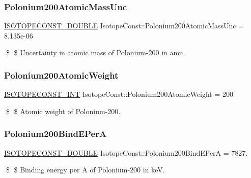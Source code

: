 \subsubsection{\texorpdfstring{Polonium200\+Atomic\+Mass\+Unc}{Polonium200AtomicMassUnc}}
{\footnotesize\ttfamily \mbox{\hyperlink{group___isotope_const-_macros_ga8f45a7272ce02c0b4c65c44636ed719a}{I\+S\+O\+T\+O\+P\+E\+C\+O\+N\+S\+T\+\_\+\+D\+O\+U\+B\+LE}} Isotope\+Const\+::\+Polonium200\+Atomic\+Mass\+Unc = 8.\+135e-\/06}

\$ \$ Uncertainty in atomic mass of Polonium-\/200 in amu. \mbox{\label{group___isotope_const-_polonium-_po200_gaa5de176e4cfec4ef41879cecb3fe0255}} 
\subsubsection{\texorpdfstring{Polonium200\+Atomic\+Weight}{Polonium200AtomicWeight}}
{\footnotesize\ttfamily \mbox{\hyperlink{group___isotope_const-_macros_ga5f18360b3e99483a35c32d789e62621c}{I\+S\+O\+T\+O\+P\+E\+C\+O\+N\+S\+T\+\_\+\+I\+NT}} Isotope\+Const\+::\+Polonium200\+Atomic\+Weight = 200}

\$ \$ Atomic weight of Polonium-\/200. \mbox{\label{group___isotope_const-_polonium-_po200_gace1166e6b7c2ea7ec9b22aed57307247}} 
\subsubsection{\texorpdfstring{Polonium200\+Bind\+E\+PerA}{Polonium200BindEPerA}}
{\footnotesize\ttfamily \mbox{\hyperlink{group___isotope_const-_macros_ga8f45a7272ce02c0b4c65c44636ed719a}{I\+S\+O\+T\+O\+P\+E\+C\+O\+N\+S\+T\+\_\+\+D\+O\+U\+B\+LE}} Isotope\+Const\+::\+Polonium200\+Bind\+E\+PerA = 7827.}

\$ \$ Binding energy per A of Polonium-\/200 in keV. \mbox{\label{group___isotope_const-_polonium-_po200_gae30b30240138a2a2671ae94b7e1dddf7}} 
